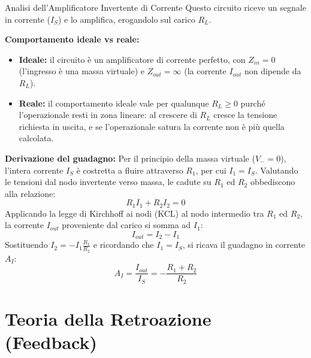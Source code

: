 \begin{teorema}{Analisi dell'Amplificatore Invertente di Corrente}
    Questo circuito riceve un segnale in corrente ($I_S$) e lo amplifica, erogandolo sul carico $R_L$.
    
    \noindent \textbf{Comportamento ideale vs reale:}
    \begin{itemize}[label=$\ast$, leftmargin=*, itemsep=0.1cm, topsep=0.1cm]
        \item \textbf{Ideale:} il circuito è un amplificatore di corrente perfetto, con $Z_{in} = 0$ (l'ingresso è una massa virtuale) e $Z_{out} = \infty$ (la corrente $I_{out}$ non dipende da $R_L$).
        \item \textbf{Reale:} il comportamento ideale vale per qualunque $R_L \ge 0$ purché l'operazionale resti in zona lineare: al crescere di $R_L$ cresce la tensione richiesta in uscita, e se l'operazionale satura la corrente non è più quella calcolata.
    \end{itemize}

    \noindent \textbf{Derivazione del guadagno:}
    Per il principio della massa virtuale ($V_- = 0$), l'intera corrente $I_S$ è costretta a fluire attraverso $R_1$, per cui $I_1 = I_S$. Valutando le tensioni dal nodo invertente verso massa, le cadute su $R_1$ ed $R_2$ obbediscono alla relazione:
    \[ R_1 I_1 + R_2 I_2 = 0 \]
    Applicando la legge di Kirchhoff ai nodi (KCL) al nodo intermedio tra $R_1$ ed $R_2$, la corrente $I_{out}$ proveniente dal carico si somma ad $I_1$:
    \[ I_{out} = I_2 - I_1 \]
    Sostituendo $I_2 = -I_1 \frac{R_1}{R_2}$ e ricordando che $I_1 = I_S$, si ricava il guadagno in corrente $A_I$:
    \[ A_I = \frac{I_{out}}{I_S} = - \frac{R_1 + R_2}{R_2} \]
\end{teorema}

\section{Teoria della Retroazione (Feedback)}

